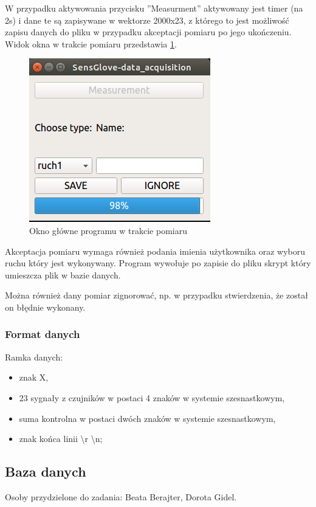 \documentclass{article}
\begin{document}
W przypadku aktywowania przycisku ''Measurment'' aktywowany jest timer (na 2s) i dane te są zapisywane w wektorze 2000x23, z którego to jest możliwość zapisu danych do pliku w przypadku akceptacji pomiaru po jego ukończeniu. Widok okna w trakcie pomiaru przedstawia \ref{rys:oknopomiar}.
\begin{figure}[H]
    \centering
    \includegraphics[scale=0.6]{oknopomiar.png}
    \caption{Okno główne programu w trakcie pomiaru}
    \label{rys:oknopomiar}
\end{figure}

Akceptacja pomiaru wymaga również podania imienia użytkownika oraz wyboru ruchu który jest wykonywany. Program wywołuje po zapisie do pliku skrypt który umieszcza plik w bazie danych.

Można również dany pomiar zignorować, np. w przypadku stwierdzenia, że został on błędnie wykonany.

\subsubsection{Format danych}
Ramka danych:
\begin{itemize}
    \item znak X,
    \item 23 sygnały z czujników w postaci 4 znaków w systemie szesnastkowym,
    \item suma kontrolna w postaci dwóch znaków w systemie szesnastkowym,
    \item znak końca linii \textbackslash r \textbackslash n;
\end{itemize}

\subsection{Baza danych}
Osoby przydzielone do zadania: Beata Berajter, Dorota Gidel.
\end{document}
